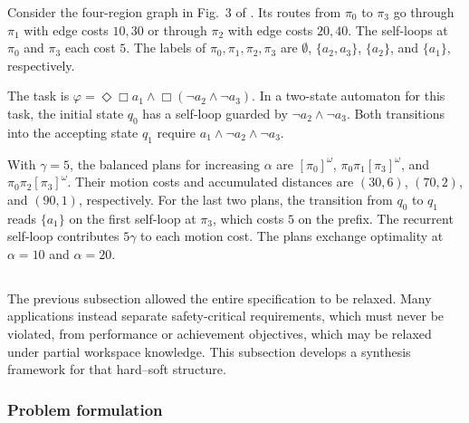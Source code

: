 \begin{revision}
\begin{example}\label{ch03:examp:singleRS}
Consider the four-region graph in Fig.~3 of \citet{guo2012infeasible}.
Its routes from $\pi_0$ to $\pi_3$ go through $\pi_1$ with edge costs $10,30$
or through $\pi_2$ with edge costs $20,40$. The self-loops at $\pi_0$ and
$\pi_3$ each cost $5$. The labels of $\pi_0,\pi_1,\pi_2,\pi_3$ are
$\emptyset$, $\{a_2,a_3\}$, $\{a_2\}$, and $\{a_1\}$, respectively.

The task is $\varphi=\Diamond\Box a_1\land\Box(\neg a_2\land\neg a_3)$.
In a two-state automaton for this task, the initial state $q_0$ has a
self-loop guarded by $\neg a_2\land\neg a_3$. Both transitions into the
accepting state $q_1$ require $a_1\land\neg a_2\land\neg a_3$.

With $\gamma=5$, the balanced plans for increasing $\alpha$ are
$[\pi_0]^\omega$, $\pi_0\pi_1[\pi_3]^\omega$, and $\pi_0\pi_2[\pi_3]^\omega$.
Their motion costs and accumulated distances are $(30,6)$, $(70,2)$,
and $(90,1)$, respectively. For the last two plans, the transition from
$q_0$ to $q_1$ reads $\{a_1\}$ on the first self-loop at $\pi_3$, which costs
$5$ on the prefix. The recurrent self-loop contributes $5\gamma$ to each
motion cost. The plans exchange optimality at $\alpha=10$ and $\alpha=20$.
\end{example}
\end{revision}












\subsection{}\label{ch03:sec:soft-hard}

The previous subsection allowed the entire specification to be relaxed. Many
applications instead separate safety-critical requirements, which must never be
violated, from performance or achievement objectives, which may be relaxed under
partial workspace knowledge. This subsection develops a synthesis framework for
that hard--soft structure.

\subsubsection{Problem formulation}\label{ch03:subsec:formulation}


